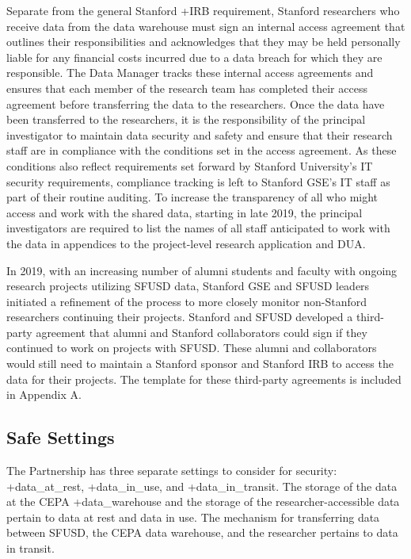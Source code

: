 \documentclass[
]{book}
\begin{document}
Separate from the general Stanford +IRB\textbar{} requirement, Stanford researchers who receive data from the data warehouse must sign an internal access agreement that outlines their responsibilities and acknowledges that they may be held personally liable for any financial costs incurred due to a data breach for which they are responsible. The Data Manager tracks these internal access agreements and ensures that each member of the research team has completed their access agreement before transferring the data to the researchers. Once the data have been transferred to the researchers, it is the responsibility of the principal investigator to maintain data security and safety and ensure that their research staff are in compliance with the conditions set in the access agreement. As these conditions also reflect requirements set forward by Stanford University's IT security requirements, compliance tracking is left to Stanford GSE's IT staff as part of their routine auditing. To increase the transparency of all who might access and work with the shared data, starting in late 2019, the principal investigators are required to list the names of all staff anticipated to work with the data in appendices to the project-level research application and DUA.

In 2019, with an increasing number of alumni students and faculty with ongoing research projects utilizing SFUSD data, Stanford GSE and SFUSD leaders initiated a refinement of the process to more closely monitor non-Stanford researchers continuing their projects. Stanford and SFUSD developed a third-party agreement that alumni and Stanford collaborators could sign if they continued to work on projects with SFUSD. These alumni and collaborators would still need to maintain a Stanford sponsor and Stanford IRB to access the data for their projects. The template for these third-party agreements is included in Appendix A.

\hypertarget{safe-settings-5}{%
\subsection{Safe Settings}\label{safe-settings-5}}

The Partnership has three separate settings to consider for security: +data\_at\_rest\textbar, +data\_in\_use\textbar, and +data\_in\_transit\textbar. The storage of the data at the CEPA +data\_warehouse\textbar{} and the storage of the researcher-accessible data pertain to data at rest and data in use. The mechanism for transferring data between SFUSD, the CEPA data warehouse, and the researcher pertains to data in transit.
\end{document}
